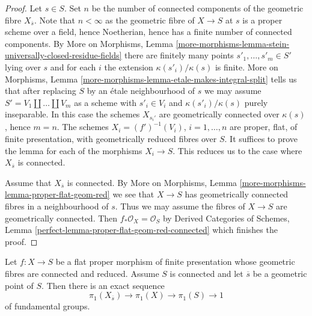 \begin{proof}
Let $s \in S$. Set $n$ be the number of connected components of
the geometric fibre $X_{\overline{s}}$. Note that $n < \infty$ as the geometric
fibre of $X \to S$ at $s$ is a proper scheme over a field, hence Noetherian,
hence has a finite number of connected components.
By More on Morphisms, Lemma
\ref{more-morphisms-lemma-stein-universally-closed-residue-fields}
there are finitely many points $s'_1, \ldots, s'_m \in S'$ lying over $s$
and for each $i$ the extension $\kappa(s'_i)/\kappa(s)$ is finite.
More on Morphisms,
Lemma \ref{more-morphisms-lemma-etale-makes-integral-split}
tells us that after replacing $S$ by an \'etale neighbourhood
of $s$ we may assume $S' = V_1 \amalg \ldots \amalg V_m$ as a scheme
with $s'_i \in V_i$ and $\kappa(s'_i)/\kappa(s)$ purely inseparable.
In this case the schemes $X_{s_i'}$ are geometrically connected
over $\kappa(s)$, hence $m = n$.
The schemes $X_i = (f')^{-1}(V_i)$, $i = 1, \ldots, n$
are proper, flat, of finite presentation, with geometrically
reduced fibres over $S$. It suffices to prove the lemma
for each of the morphisms $X_i \to S$. This reduces us to the case where
$X_{\overline{s}}$ is connected.

\medskip\noindent
Assume that $X_{\overline{s}}$ is connected. By
More on Morphisms, Lemma \ref{more-morphisms-lemma-proper-flat-geom-red}
we see that $X \to S$ has geometrically connected
fibres in a neighbourhood of $s$. Thus
we may assume the fibres of $X \to S$ are geometrically connected.
Then $f_*\mathcal{O}_X = \mathcal{O}_S$ by
Derived Categories of Schemes, Lemma
\ref{perfect-lemma-proper-flat-geom-red-connected}
which finishes the proof.
\end{proof}

\begin{proposition}
\label{proposition-first-homotopy-sequence}
Let $f : X \to S$ be a flat proper morphism of finite presentation whose
geometric fibres are connected and reduced. Assume $S$ is connected and
let $\overline{s}$ be a geometric point of $S$. Then there is an exact
sequence
$$
\pi_1(X_{\overline{s}}) \to \pi_1(X) \to \pi_1(S) \to 1
$$
of fundamental groups.
\end{proposition}

